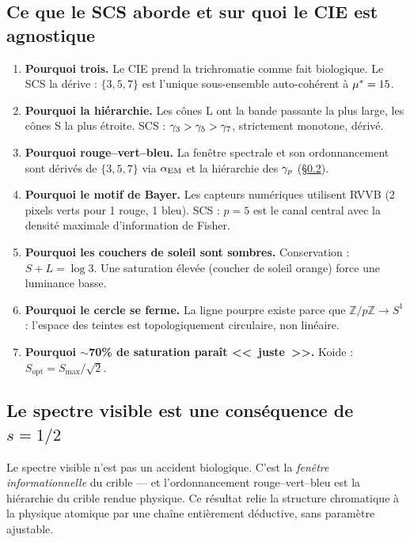 \documentclass[12pt,a4paper]{article}
\begin{document}
\subsection{Ce que le SCS aborde et sur quoi le CIE est agnostique}

\begin{enumerate}[nosep]
\item \textbf{Pourquoi trois.} Le CIE prend la trichromatie comme fait
  biologique. Le SCS la d\'erive : $\{3,5,7\}$ est l'unique
  sous-ensemble auto-coh\'erent \`a ${\mu^{*}} = 15$.
\item \textbf{Pourquoi la hi\'erarchie.} Les c\^ones L ont la bande
  passante la plus large, les c\^ones S la plus \'etroite. SCS :
  $\gamma_{3} > \gamma_{5} > \gamma_{7}$, strictement monotone, d\'eriv\'e.
\item \textbf{Pourquoi rouge--vert--bleu.} La fen\^etre spectrale et
  son ordonnancement sont d\'eriv\'es de $\{3,5,7\}$ via $\alpha_{\mathrm{EM}}$
  et la hi\'erarchie des $\gamma_{p}$ (\S\ref{sec:visible}).
\item \textbf{Pourquoi le motif de Bayer.} Les capteurs num\'eriques
  utilisent RVVB (2 pixels verts pour 1 rouge, 1 bleu). SCS : $p=5$
  est le canal central avec la densit\'e maximale d'information de
  Fisher.
\item \textbf{Pourquoi les couchers de soleil sont sombres.}
  Conservation : $S + L = \log 3$. Une saturation \'elev\'ee (coucher
  de soleil orange) force une luminance basse.
\item \textbf{Pourquoi le cercle se ferme.} La ligne pourpre existe
  parce que $\mathbb{Z}/p\mathbb{Z} \to S^1$ : l'espace des teintes est
  topologiquement circulaire, non lin\'eaire.
\item \textbf{Pourquoi $\sim$70\% de saturation para\^it <<~juste~>>.}
  Koide : $S_{\text{opt}} = S_{\max}/\sqrt{2}$.
\end{enumerate}

\subsection{Le spectre visible est une cons\'equence de $s = 1/2$}
\label{sec:visible}

Le spectre visible n'est pas un accident biologique. C'est la
\emph{fen\^etre informationnelle} du crible --- et l'ordonnancement
rouge--vert--bleu est la hi\'erarchie du crible rendue physique. Ce
r\'esultat relie la structure chromatique \`a la physique atomique par
une cha\^ine enti\`erement d\'eductive, sans param\`etre ajustable.
\end{document}
